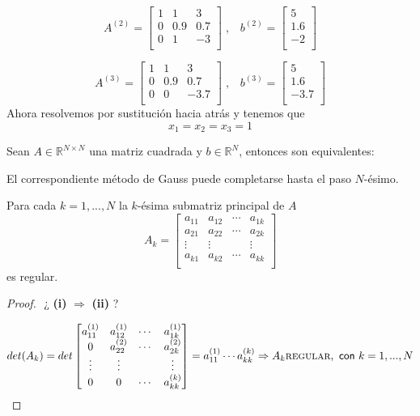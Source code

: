 \begin{nlist}
\begin{ejemplo}
	\[ A^{(2)} =
	\begin{bmatrix}
	1 & 1 & 3 \\
	0 & 0.9 & 0.7 \\
	0 & 1 & -3 \\
	\end{bmatrix} \; ,
	\; \; \;
	b^{(2)} =
	\begin{bmatrix}
	5 \\
	1.6 \\
	-2 \\
	\end{bmatrix} \]
	
	\[ A^{(3)} =
	\begin{bmatrix}
	1 & 1 & 3 \\
	0 & 0.9 & 0.7 \\
	0 & 0 & -3.7 \\ 
	\end{bmatrix} \; ,
	\; \; \;
	b^{(3)} =
	\begin{bmatrix}
	5 \\
	1.6 \\
	-3.7 \\
	\end{bmatrix} \]
	Ahora resolvemos por sustitución hacia atrás y tenemos que
	\[ x_1 = x_2 = x_3 = 1 \]
	\end{ejemplo}
			
	\begin{nprop}
	Sean $A \in \mathbb{R}^{N \times N}$ una matriz cuadrada y $b \in \mathbb{R}^N$, entonces son equivalentes:
		\begin{nlist}
		\item El correspondiente método de Gauss puede completarse hasta el paso $N$-ésimo.
		\item Para cada $k = 1,..., N$ la $k$-ésima submatriz principal de $A$
		\[ A_k =
		\begin{bmatrix}
		a_{11} & a_{12} & \cdots & a_{1k} \\
		a_{21} & a_{22} & \cdots & a_{2k} \\
		\vdots & \vdots & & \vdots \\
		a_{k1} & a_{k2} & \cdots & a_{kk} \\
		\end{bmatrix} \]
		es regular.
		\end{nlist}
	\end{nprop}
	
	\begin{proof}
	$ $
	¿ \textbf{(i)} $\Rightarrow$ \textbf{(ii)} ?
	
	\[ det(A_k) = det \begin{bmatrix}
	a_{11}^{(1)} & a_{12}^{(1)} & \cdots & a_{1k}^{(1)} \\
		0 & a_{22}^{(2)} & \cdots & a_{2k}^{(2)} \\
		\vdots & \vdots & & \vdots \\
		0 & 0 & \cdots & a_{kk}^{(k)} \\
	\end{bmatrix} = a_{11}^{(1)} \cdots a_{kk}^{(k)} \Rightarrow A_k \textsc{regular} , \textsf{ con } k=1,...,N\]
	

\end{proof}
\end{nlist}
